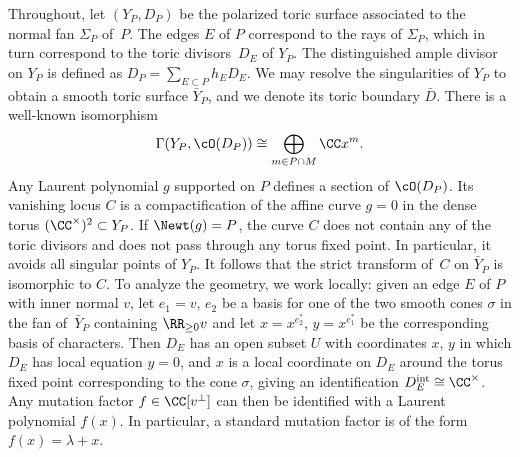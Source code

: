 	Throughout, let $(Y_P, D_P)$ be the polarized toric surface associated to the normal fan $\Sigma_P$ of~$P$. The edges $E$ of $P$ correspond to the rays of $\Sigma_P$, which in turn correspond to the toric divisors~$D_E$ of $Y_{P}$. The distinguished ample divisor on $Y_P$ is defined as
$D_P=\sum_{E \subset P} h_ED_E$.
	We may resolve the singularities of ${Y}_P$ to obtain a smooth toric surface $\bar{Y}_P$, and we denote its toric boundary $\bar{D}$.
	There is a well-known isomorphism
	\begin{equation}\label{eq:sections}
		\Gamma(Y_P, \cO(D_P)) \cong \bigoplus_{m \in P \cap M} \CC x^m.
	\end{equation}
Any Laurent polynomial $g$ supported on $P$ defines a section of $\cO(D_P)$. Its vanishing locus $C$ is a compactification of the affine curve $g=0$ in the dense torus $(\CC^\times)^2 \subset Y_P$. If $\Newt(g)=P$, the curve $C$ does not contain any of the toric divisors and does not pass through any torus fixed point. In particular, it avoids all singular points of $Y_P$.
	It follows that the strict transform of~$C$ on $\bar{Y}_P$ is isomorphic to $C$.
	To analyze the geometry, we work locally: given an edge $E$ of $P$ with inner normal $v$, let $e_1=v$, $e_2$ be a basis for one of the two smooth cones $\sigma$ in the fan of~$\bar{Y}_P$ containing $\RR_{\geq 0}v$ and let $x=x^{e_2^*}$, $y=x^{e_1^*}$ be the corresponding basis of characters. Then $D_E$ has an open subset $U$ with coordinates $x$, $y$ in which $D_E$ has local equation $y=0$, and $x$ is a local coordinate on $D_E$ around the torus fixed point corresponding to the cone $\sigma$, giving an identification $D_E^{\rm int} \cong \CC^\times$. Any mutation factor $f \in \CC[v^\perp]$ can then be identified with a Laurent polynomial $f(x)$. In particular, a standard mutation factor is of the form $f(x)=\lambda+x$.
	
